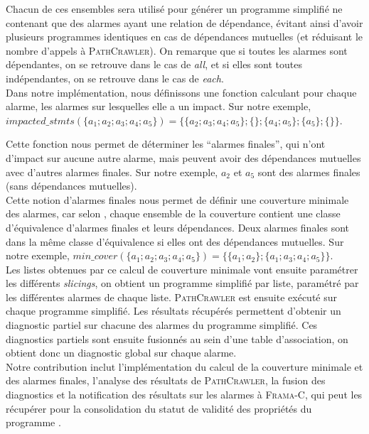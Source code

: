 Chacun de ces ensembles sera utilisé pour générer un programme simplifié ne
contenant que des alarmes ayant une relation de dépendance, évitant ainsi
d'avoir plusieurs programmes identiques en cas de dépendances mutuelles (et
réduisant le nombre d'appels à \textsc{PathCrawler}).
On remarque que si toutes les alarmes sont dépendantes, on se retrouve dans le
cas de {\em all}, et si elles sont toutes indépendantes, on se retrouve dans le
cas de {\em each}.\\


Dans notre implémentation, nous définissons une fonction calculant pour chaque
alarme, les alarmes sur lesquelles elle a un impact.
Sur notre exemple, $impacted\_stmts(\{a_1; a_2; a_3; a_4; a_5\}) =
\{\{a_2; a_3; a_4; a_5\}; \{\}; \{a_4; a_5\}; \{a_5\}; \{\}\}$.

Cette fonction nous permet de déterminer les ``alarmes finales'', qui n'ont
d'impact sur aucune autre alarme, mais peuvent avoir des dépendances mutuelles
avec d'autres alarmes finales.
Sur notre exemple, $a_2$ et $a_5$ sont des alarmes finales (sans dépendances
mutuelles).\\

Cette notion d'alarmes finales nous permet de définir une couverture minimale
des alarmes, car selon \cite{SANTE}, chaque ensemble de la couverture contient
une classe d'équivalence d'alarmes finales et leurs dépendances.
Deux alarmes finales sont dans la même classe d'équivalence si elles ont des
dépendances mutuelles.
Sur notre exemple, $min\_cover(\{a_1; a_2; a_3; a_4; a_5\}) =
\{\{a_1; a_2\}; \{a_1; a_3; a_4; a_5\}\}$.\\

Les listes obtenues par ce calcul de couverture minimale vont ensuite paramétrer
les différents {\em slicings}, on obtient un programme simplifié par liste,
paramétré par les différentes alarmes de chaque liste. \textsc{PathCrawler} est
ensuite exécuté sur chaque programme simplifié. Les résultats récupérés
permettent d'obtenir un diagnostic partiel sur chacune des alarmes du programme
simplifié. Ces diagnostics partiels sont ensuite fusionnés au sein d'une table
d'association, on obtient donc un diagnostic global sur chaque alarme.\\

Notre contribution inclut l'implémentation du calcul de la couverture minimale
et des alarmes finales, l'analyse des résultats de \textsc{PathCrawler}, la
fusion des diagnostics et la notification des résultats sur les alarmes à
\textsc{Frama-C}, qui peut les récupérer pour la consolidation du statut de
validité des propriétés du programme \cite{property-status}.\\


